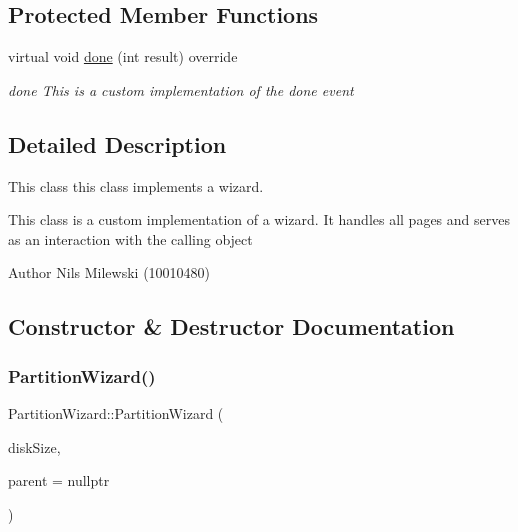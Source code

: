 \subsection*{Protected Member Functions}
\begin{DoxyCompactItemize}
\item 
virtual void \mbox{\hyperlink{classui_1_1wizard_1_1_partition_wizard_af5141307f45f8fc9bd091c718a0f31b6}{done}} (int result) override
\begin{DoxyCompactList}\small\item\em done This is a custom implementation of the done event \end{DoxyCompactList}\end{DoxyCompactItemize}


\subsection{Detailed Description}
This class this class implements a wizard. 

This class is a custom implementation of a wizard. It handles all pages and serves as an interaction with the calling object \begin{DoxyAuthor}{Author}
Nils Milewski (10010480) 
\end{DoxyAuthor}


\subsection{Constructor \& Destructor Documentation}
\mbox{\label{classui_1_1wizard_1_1_partition_wizard_aab98955e5371a971ac94b7f0d4b24258}} 
\subsubsection{\texorpdfstring{Partition\+Wizard()}{PartitionWizard()}}
{\footnotesize\ttfamily Partition\+Wizard\+::\+Partition\+Wizard (\begin{DoxyParamCaption}\item[{unsigned long long}]{disk\+Size,  }\item[{Q\+Widget $\ast$}]{parent = {\ttfamily nullptr} }\end{DoxyParamCaption})}



